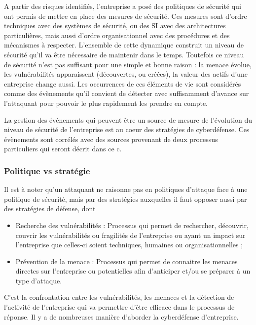 A partir des risques identifiés, l’entreprise a posé des politiques de sécurité qui ont permis de mettre en place des mesures de sécurité. Ces mesures sont d’ordre techniques avec des systèmes de sécurité, ou des SI avec des architectures particulières, mais aussi d’ordre organisationnel avec des procédures et des mécanismes à respecter.
L’ensemble de cette dynamique construit un niveau de sécurité qu’il va être nécessaire de maintenir dans le temps. Toutefois ce niveau de sécurité n’est pas suffisant pour une simple et bonne raison : la menace évolue, les vulnérabilités apparaissent (découvertes, ou créées), la valeur des actifs d’une entreprise change aussi. 
Les occurrences de ces éléments de vie sont considérés comme des évènements qu’il convient de détecter avec suffisamment d’avance sur l’attaquant pour pouvoir le plus rapidement les prendre en compte.

La gestion des événements qui peuvent être un source de mesure de l’évolution du niveau de sécurité de l’entreprise est au coeur des stratégies de cyberdéfense. Ces évènements sont corrélés avec des sources provenant de deux processus particuliers qui seront décrit dans ce c\edoc.

\begin{frame}
\frametitle<presentation>{Politique vs stratégie}
Il est à noter qu'un attaquant ne raisonne pas en politiques d'attaque face à une politique de sécurité, mais par des stratégies auxquelles il faut opposer aussi par des stratégies de défense, dont 

\begin{itemize}
\item Recherche des vulnérabilités : Processus qui permet de rechercher, découvrir, couvrir les vulnérabilités ou fragilités de l’entreprise ou ayant un impact sur l’entreprise que celles-ci soient techniques, humaines ou organisationnelles ;
\item Prévention de la menace : Processus qui permet de connaitre les menaces directes sur l’entreprise ou potentielles afin d’anticiper et/ou se préparer à un type d’attaque.
\end{itemize}
\end{frame}

C’est la confrontation entre les vulnérabilités, les menaces et la détection de l’activité de l’entreprise qui va permettre d’être efficace dans le processus de réponse. Il y a de nombreuses manière d’aborder la cyberdéfense d’entreprise.

